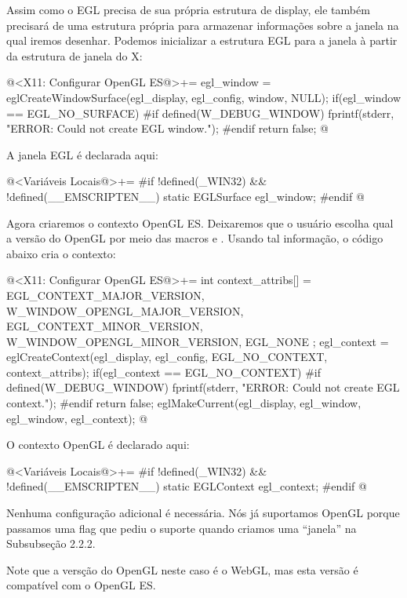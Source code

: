 Assim como o EGL precisa de sua própria estrutura de display, ele
também precisará de uma estrutura própria para armazenar informações
sobre a janela na qual iremos desenhar. Podemos inicializar a
estrutura EGL para a janela à partir da estrutura de janela do X:

\iniciocodigo
@<X11: Configurar OpenGL ES@>+=
egl_window = eglCreateWindowSurface(egl_display, egl_config, window,
                                    NULL);
if(egl_window == EGL_NO_SURFACE){
#if defined(W_DEBUG_WINDOW)
  fprintf(stderr, "ERROR: Could not create EGL window.\n");
#endif
  return false;
}
@
\fimcodigo

A janela EGL é declarada aqui:

\iniciocodigo
@<Variáveis Locais@>+=
#if !defined(_WIN32) && !defined(__EMSCRIPTEN__)
static EGLSurface egl_window;
#endif
@
\fimcodigo


Agora criaremos o contexto OpenGL ES. Deixaremos que o usuário escolha
qual a versão do OpenGL por meio das
macros  e
. Usando tal informação, o código abaixo cria o contexto:

\iniciocodigo
@<X11: Configurar OpenGL ES@>+=
{
  int context_attribs[] = {
    EGL_CONTEXT_MAJOR_VERSION, W_WINDOW_OPENGL_MAJOR_VERSION,
    EGL_CONTEXT_MINOR_VERSION, W_WINDOW_OPENGL_MINOR_VERSION,
    EGL_NONE
  };
  egl_context = eglCreateContext(egl_display, egl_config,
                                 EGL_NO_CONTEXT, context_attribs);
  if(egl_context == EGL_NO_CONTEXT){
#if defined(W_DEBUG_WINDOW)
    fprintf(stderr, "ERROR: Could not create EGL context.\n");
#endif
    return false;
  }
  eglMakeCurrent(egl_display, egl_window, egl_window, egl_context);
}
@
\fimcodigo

O contexto OpenGL é declarado aqui:

\iniciocodigo
@<Variáveis Locais@>+=
#if !defined(_WIN32) && !defined(__EMSCRIPTEN__)
static EGLContext egl_context;
#endif
@
\fimcodigo


Nenhuma configuração adicional é necessária. Nós já suportamos OpenGL
porque passamos uma flag que pediu o suporte quando criamos uma
``janela'' na Subsubseção 2.2.2.

Note que a versção do OpenGL neste caso é o WebGL, mas esta versão é
compatível com o OpenGL ES.


